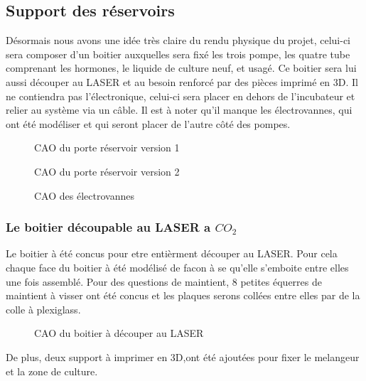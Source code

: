 \documentclass[a4paper, 11pt]{article}
\begin{document}
\subsection{Support des réservoirs}
Désormais nous avons une idée très claire du rendu physique du projet, celui-ci sera composer d'un boitier auxquelles sera fixé les trois pompe, les quatre tube comprenant les hormones, le liquide de culture neuf, et usagé.
Ce boitier sera lui aussi découper au LASER et au besoin renforcé par des pièces imprimé en 3D.
Il ne contiendra pas l'électronique, celui-ci sera placer en dehors de l'incubateur et relier au système via un câble.
Il est à noter qu'il manque les électrovannes, qui ont été modéliser et qui seront placer de l'autre côté des pompes.
\begin{multicols}{2}
    \begin{figure}[H]
        \centering
        \caption{CAO du porte réservoir version 1}
        \label{fig:CAO_reservoir1}
    \end{figure}
    \begin{figure}[H]
        \centering
        \caption{CAO du porte réservoir version 2}
        \label{fig:CAO_reservoir2}
    \end{figure}
\end{multicols}
\begin{figure}[H]
    \centering
    \caption{CAO des électrovannes}
    \label{fig:CAO_electrovanne}
\end{figure}
\subsubsection{Le boitier découpable au LASER a $ CO_2 $}
Le boitier à été concus pour etre entièrment découper au LASER. Pour cela chaque face du boitier à été modélisé de facon à se qu'elle s'emboite entre elles une fois assemblé.
Pour des questions de maintient, 8 petites équerres de maintient à visser ont été concus
et les plaques serons collées entre elles par de la colle à plexiglass.
\begin{figure}[H]
    \centering
    \caption{CAO du boitier à découper au LASER}
    \label{fig:CAO_boitier_decoupe_LASER}
\end{figure}
De plus, deux support à imprimer en 3D,ont été ajoutées pour fixer le melangeur et la zone de culture.
\newpage
\end{document}
